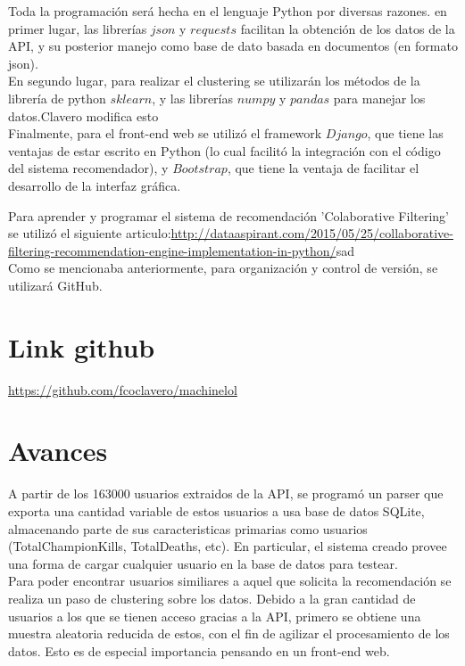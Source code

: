\documentclass[letterpaper,11pt, spanish]{article}
\begin{document}
Toda la programación será hecha en el lenguaje Python por diversas razones. en
primer lugar, las librerías $json$ y $requests$ facilitan la obtención de los
datos de la API, y su posterior manejo como base de dato basada en documentos
(en formato json).\\

En segundo lugar, para realizar el clustering se utilizarán
los métodos de la librería de python $sklearn$, y las librerías $numpy$ y $pandas$ para
manejar los datos.Clavero modifica esto \\

Finalmente, para el front-end web se utilizó el framework $Django$, que tiene las ventajas de estar escrito en Python (lo cual facilitó la integración con el código del sistema recomendador), y $Bootstrap$, que tiene la ventaja de facilitar el desarrollo de la interfaz gráfica.

Para aprender y programar el sistema de recomendación 'Colaborative Filtering' se utilizó el siguiente articulo:\url{http://dataaspirant.com/2015/05/25/collaborative-filtering-recommendation-engine-implementation-in-python/}{sad}\\

Como se mencionaba anteriormente, para organización y control de versión, se
utilizará GitHub.

\section{Link github}
\url{https://github.com/fcoclavero/machinelol}

\section{Avances}

A partir de los 163000 usuarios extraidos de la API, se programó un parser que exporta una cantidad variable de estos usuarios a usa base de datos SQLite, almacenando parte de sus caracteristicas primarias como usuarios (TotalChampionKills, TotalDeaths, etc). En particular, el sistema creado provee una forma de cargar cualquier usuario en la base de datos para testear.\\

Para poder encontrar usuarios similiares a aquel que solicita la recomendación se realiza un paso de clustering sobre los datos. Debido a la gran cantidad de usuarios a los que se tienen acceso gracias a la API, primero se obtiene una muestra aleatoria reducida de estos, con el fin de agilizar el procesamiento de los datos. Esto es de especial importancia pensando en un front-end web. \\
\end{document}

